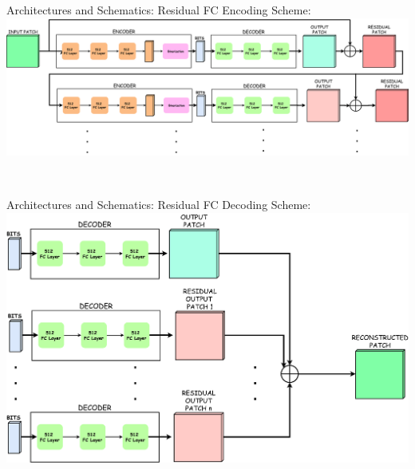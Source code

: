 \documentclass[10pt]{beamer}
\begin{document}
\begin{frame}{Architectures and Schematics:  Residual FC }
    Encoding Scheme:\\
    \vspace{5mm}
      \includegraphics[width=1.05\linewidth]{./img/encodingScheme.pdf}

      \vspace{20mm}
      \begin{figure}
        \begin{minipage}{\textwidth}
                 \\
        \end{minipage}
    \end{figure}
\end{frame}
\begin{frame}{Architectures and Schematics: Residual FC }
  Decoding Scheme:\\
      \includegraphics[width=\linewidth]{./img/reconstruction.pdf}
\end{frame}
\end{document}
